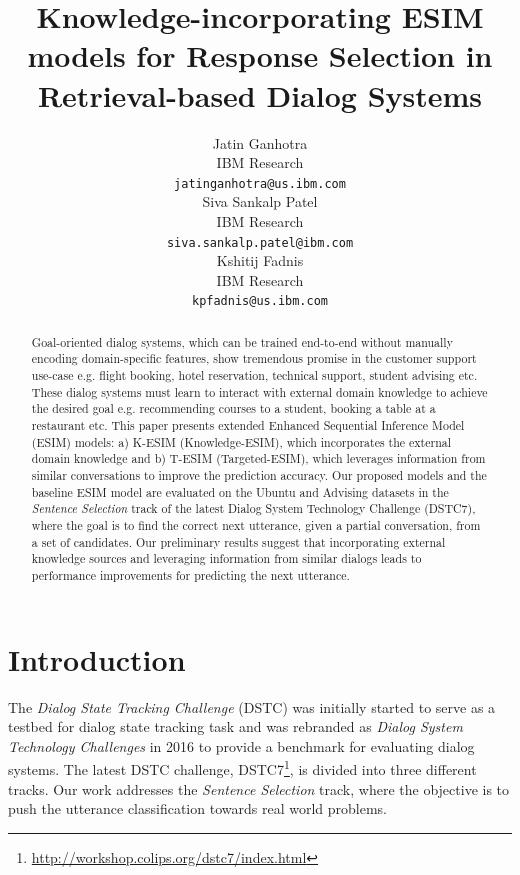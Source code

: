 \documentclass[letterpaper]{article} %
\begin{document}
\title{Knowledge-incorporating ESIM models for Response Selection in Retrieval-based Dialog Systems}
\author{
Jatin Ganhotra \\
IBM Research \\
{\tt jatinganhotra@us.ibm.com}
\\\And
Siva Sankalp Patel \\
IBM Research \\
{\tt siva.sankalp.patel@ibm.com}
\\\And
Kshitij Fadnis \\
IBM Research \\
{\tt kpfadnis@us.ibm.com}
}

\maketitle

\begin{abstract}
Goal-oriented dialog systems, which can be trained end-to-end without manually encoding domain-specific features, show tremendous promise in the customer support use-case e.g. flight booking, hotel reservation, technical support, student advising etc. These dialog systems must learn to interact with external domain knowledge to achieve the desired goal e.g. recommending courses to a student, booking a table at a restaurant etc. This paper presents extended Enhanced Sequential Inference Model (ESIM) models: a) K-ESIM (Knowledge-ESIM), which incorporates the external domain knowledge and b) T-ESIM (Targeted-ESIM), which leverages information from similar conversations to improve the prediction accuracy. Our proposed models and the baseline ESIM model are evaluated on the Ubuntu and Advising datasets in the \textit{Sentence Selection} track of the latest Dialog System Technology Challenge (DSTC7), where the goal is to find the correct next utterance, given a partial conversation, from a set of candidates. Our preliminary results suggest that incorporating external knowledge sources and leveraging information from similar dialogs leads to performance improvements for predicting the next utterance.
\end{abstract}

\section{Introduction}
\label{Introduction}
The \textit{Dialog State Tracking Challenge} (DSTC) was initially started to serve as a testbed for dialog state tracking task and was rebranded as \textit{Dialog System Technology Challenges} in 2016 to provide a benchmark for evaluating dialog systems. The latest DSTC challenge, DSTC7\footnote{\url{http://workshop.colips.org/dstc7/index.html}}, is divided into three different tracks. Our work addresses the \textit{Sentence Selection} track, where the objective is to push the utterance classification towards real world problems.
\end{document}
